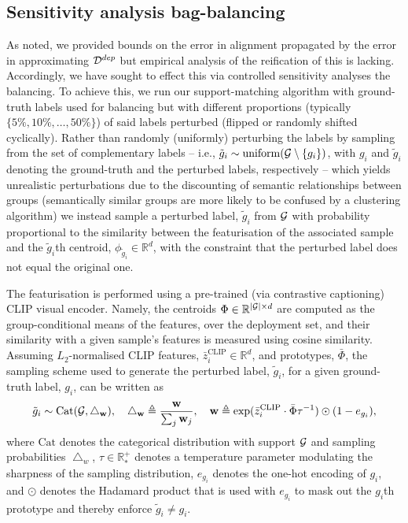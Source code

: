 {\subsection{Sensitivity analysis \wrt{} bag-balancing}
%
As noted, we provided bounds on the error in alignment propagated by the error in
approximating \( {\mathcal{D}}^{dep}\) but empirical analysis of the reification of this is lacking. 
%
Accordingly, we have sought to effect this via controlled sensitivity analyses \wrt{} the
balancing.
To achieve this, we run our support-matching algorithm with ground-truth labels used for balancing
but with different proportions (typically \( \{5\%, 10\%, \dots, 50\%\} \)) of said labels
perturbed (flipped or randomly shifted cyclically). 
%
Rather than randomly (uniformly) perturbing the labels by sampling from the set of complementary
labels -- i.e., \( \tilde{g}_i \sim \mathrm{uniform}({\mathcal{G}} \setminus \{g_i\}) \), with \( g_i \) and
\( \tilde{g}_i \) denoting the ground-truth and the perturbed labels, respectively -- which yields
unrealistic perturbations due to the discounting of semantic relationships between groups
(semantically similar groups are more likely to be confused by a clustering algorithm) we instead
sample a perturbed label, $\tilde{g}_i$ from ${\mathcal{G}}$ with probability proportional to the similarity
between the featurisation of the associated sample and the \(\tilde{g}_i\)th centroid, \(
\phi_{\tilde{g}_i} \in \mathbb{R}^d \), with the constraint that the perturbed label does not equal
the original one. 

%
The featurisation is performed using a pre-trained (via contrastive captioning) CLIP
\citep{radford2021learning} visual encoder. 
%
Namely, the centroids \( \Phi \in \mathbb{R}^{|{\mathcal{G}}| \times d} \) are computed as the
group-conditional means of the features, over the deployment set, and their similarity with a
given sample's features is measured using cosine similarity. 
%
Assuming \(L_2\)-normalised CLIP features, $\bar z_i^\text{CLIP} \in \mathbb{R}^d$, and prototypes,
$\bar \Phi$, the sampling scheme used to generate the perturbed label, $\tilde{g}_i$, for a given
ground-truth label, $g_i$, can be written as
%
\begin{align}
  \tilde{g}_i \sim \text{Cat}({\mathcal{G}}, \bigtriangleup_\mathbf{w} ), \quad
  \bigtriangleup_\mathbf{w} \triangleq  \frac{\mathbf{w}}{\sum_j \mathbf{w}_j} , \quad
  \mathbf{w} \triangleq \text{exp}(\bar z_i^\text{CLIP} \cdot \bar \Phi \tau^{-1})
  \odot (1 - e_{g_i}),
\end{align}
%
where \( \text{Cat} \) denotes the categorical distribution with support \({\mathcal{G}}\) and sampling
probabilities \( \bigtriangleup_w \), \( \tau \in \mathbb{R}^+_\ast \) denotes a temperature
parameter modulating the sharpness of the sampling distribution, \(e_{g_i}\) denotes the one-hot
encoding of \(g_i\), and \(\odot\) denotes the Hadamard product that is used with \(e_{g_i}\) to
mask out the \(g_i\)th prototype and thereby enforce \( \tilde{g}_i \neq g_i \).
%
}

